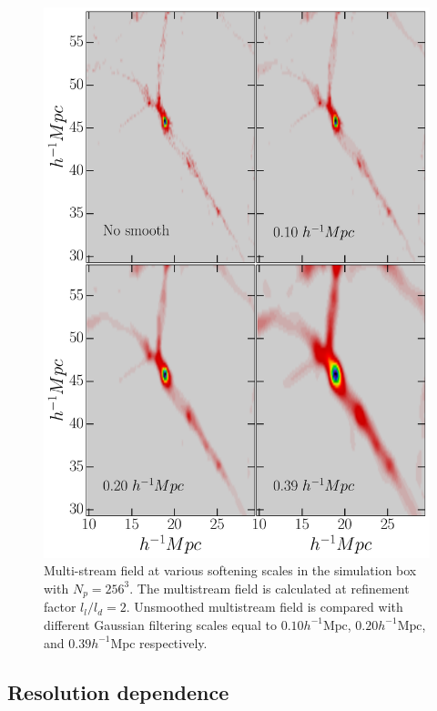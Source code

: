 \begin{figure}
\begin{minipage}[t]{.99\linewidth}
  \centering\includegraphics[width=10.cm]{Chapter4/Source_v2/fig11.pdf} 

\end{minipage}\hfill
\caption{Multi-stream field at various softening scales in the simulation box with $N_p = 256^3$. The multistream field is calculated at refinement factor $l_l/l_d= 2$. Unsmoothed multistream field is compared with different Gaussian filtering scales equal to $0.10 h^{-1} \text{Mpc}$, $0.20 h^{-1} \text{Mpc}$, and $0.39 h^{-1} \text{Mpc}$ respectively.}
\label{fig:nstrSmoothSmall}
\end{figure}



\subsection{Resolution dependence}
\label{sub:resolution}

